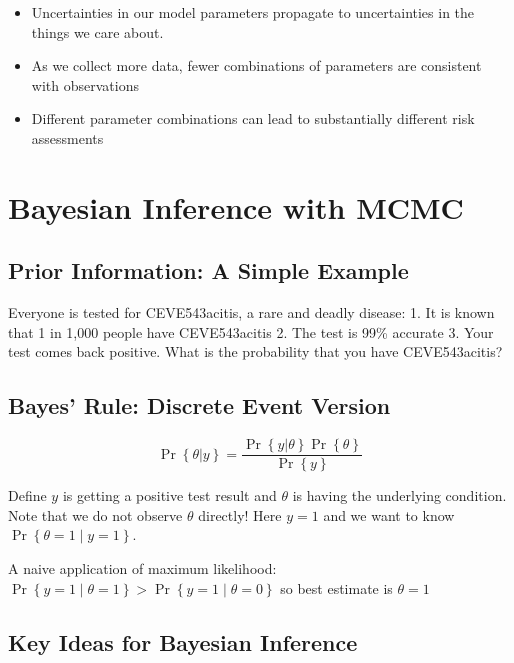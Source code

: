 \documentclass[
  letterpaper,
  DIV=11,
  numbers=noendperiod]{scrreprt}
\providecommand{\tightlist}{%
  \setlength{\itemsep}{0pt}\setlength{\parskip}{0pt}}
\begin{document}
\begin{itemize}
\tightlist
\item
  Uncertainties in our model parameters propagate to uncertainties in
  the things we care about.
\item
  As we collect more data, fewer combinations of parameters are
  consistent with observations
\item
  Different parameter combinations can lead to substantially different
  risk assessments
\end{itemize}

\section{Bayesian Inference with
MCMC}\label{bayesian-inference-with-mcmc}

\subsection{Prior Information: A Simple
Example}\label{prior-information-a-simple-example}

Everyone is tested for CEVE543acitis, a rare and deadly disease: 1. It
is known that 1 in 1,000 people have CEVE543acitis 2. The test is 99\%
accurate 3. Your test comes back positive. What is the probability that
you have CEVE543acitis?

\subsection{Bayes' Rule: Discrete Event
Version}\label{bayes-rule-discrete-event-version}

\[
\Pr \left\{ \theta | y \right\} = \frac{\Pr \left\{ y | \theta \right\} \Pr \left\{ \theta \right\}}{\Pr \left\{ y \right\}}
\]

Define \(y\) is getting a positive test result and \(\theta\) is having
the underlying condition. Note that we do not observe \(\theta\)
directly! Here \(y=1\) and we want to know
\(\Pr\left\{\theta = 1 \mid y=1 \right\}\).

A naive application of maximum likelihood:
\(\Pr\left\{y=1 \mid \theta=1 \right\} > \Pr\left\{y=1 \mid \theta=0 \right\}\)
so best estimate is \(\theta=1\)

\subsection{Key Ideas for Bayesian
Inference}\label{key-ideas-for-bayesian-inference}
\end{document}
